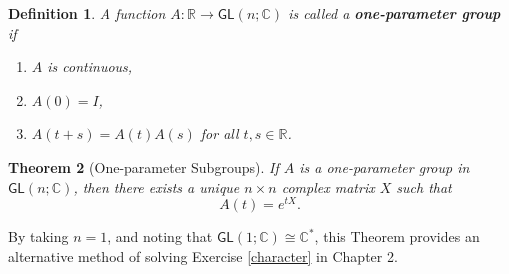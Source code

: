 \documentclass{amsbook}
\theoremstyle{plain}
\newtheorem{theorem}{Theorem}
\newtheorem{definition}[theorem]{Definition}
\numberwithin{equation}{chapter}
\numberwithin{theorem}{chapter}
\begin{document}
\begin{definition}
A function $A:\mathbb{R}\rightarrow\mathsf{GL}(n;\mathbb{C})$ is called a
\textbf{one-parameter group} if

\begin{enumerate}
\item $A$ is continuous,

\item $A(0)=I$,

\item $A(t+s)=A(t)A(s)$ for all $t,s\in\mathbb{R}$.
\end{enumerate}
\end{definition}

\begin{theorem}
[One-parameter Subgroups]\label{one.parameter}If $A$ is a one-parameter group
in $\mathsf{GL}(n;\mathbb{C})$, then there exists a unique $n\times n$ complex
matrix $X$ such that
\[
A(t)=e^{tX}\text{.}%
\]
\end{theorem}

By taking $n=1$, and noting that $\mathsf{GL}(1;\mathbb{C})\cong
\mathbb{C}^{\ast}$, this Theorem provides an alternative method of solving
Exercise \ref{character} in Chapter 2.
\end{document}
